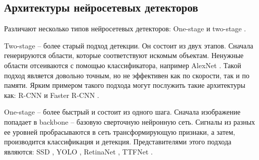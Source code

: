 \subsection{Архитектуры нейросетевых детекторов}\label{sect-4}

Различают несколько типов нейросетевых детекторов: One-stage и two-stage \cite{lib-detector-types}.

Two-stage -- более старый подход детекции. Он состоит из двух этапов. Сначала генерируются области, которые соответствуют искомым объектам. Ненужные области отсеиваются с помощью классификатора, например AlexNet \cite{lib-alexnet}. Такой подход является довольно точным, но не эффективен как по скорости, так и по памяти. Ярким примером такого подхода могут послужить такие архитектуры как: R-CNN и Faster R-CNN \cite{lib-rcnn}.

One-stage -- более быстрый и состоит из одного шага. Сначала изображение попадает в backbone -- базовую сверточную нейронную сеть. Сигналы из разных ее уровней пробрасываются в сеть трансформирующую признаки, а затем, производится классификация и детекция. Представителями этого подхода являются: SSD \cite{lib-ssd}, YOLO \cite{lib-yolo}, RetinaNet \cite{lib-retinanet}, TTFNet \cite{lib-ttfnet}.

\clearpage
